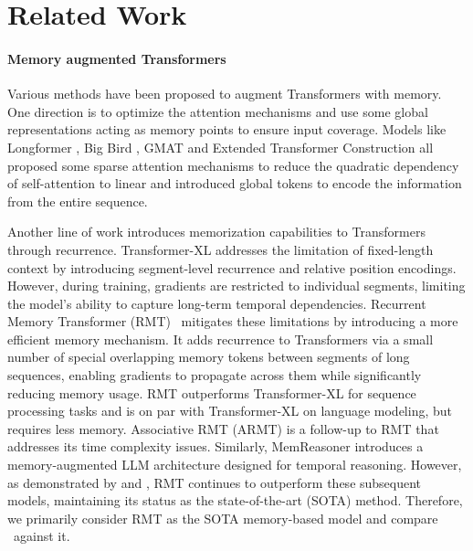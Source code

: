 \section{Related Work}
\paragraph{Memory augmented Transformers}
Various methods have been proposed to augment Transformers with memory. One direction is to optimize the attention mechanisms and use some global representations acting as memory points to ensure input coverage. Models like Longformer \cite{DBLP:journals/corr/abs-2004-05150}, Big Bird \cite{DBLP:journals/corr/abs-2007-14062}, GMAT \cite{DBLP:journals/corr/abs-2006-03274} and Extended Transformer Construction \cite{DBLP:journals/corr/abs-2004-08483} all proposed some sparse attention mechanisms to reduce the quadratic dependency of self-attention to linear and introduced global tokens to encode the information from the entire sequence.

Another line of work introduces memorization capabilities to Transformers through recurrence. Transformer-XL \cite{DBLP:journals/corr/abs-1901-02860} addresses the limitation of fixed-length context by introducing segment-level recurrence and relative position encodings. 
However, during training, gradients are restricted to individual segments, limiting the model's ability to capture long-term temporal dependencies. 
Recurrent Memory Transformer (RMT)~\cite{bulatov2022recurrentmemorytransformer} mitigates these limitations by introducing a more efficient memory mechanism. It adds recurrence to Transformers via a small number of special overlapping memory tokens between segments of long sequences, enabling gradients to propagate across them while significantly reducing memory usage. 
RMT outperforms Transformer-XL for sequence processing tasks and is on par with Transformer-XL on language modeling, but requires less memory.
Associative RMT (ARMT) \cite{rodkin2024associativerecurrentmemorytransformer} is a follow-up to RMT that addresses its time complexity issues. 
Similarly, MemReasoner \cite{ko2024memreasoner} introduces a memory-augmented LLM architecture designed for temporal reasoning. However, as demonstrated by \citet{kuratov2024babilong} and \citet{ko2024memreasoner}, RMT continues to outperform these subsequent models, maintaining its status as the state-of-the-art (SOTA) method. 
Therefore, we primarily consider RMT as the SOTA memory-based model and compare \name\ against it.

